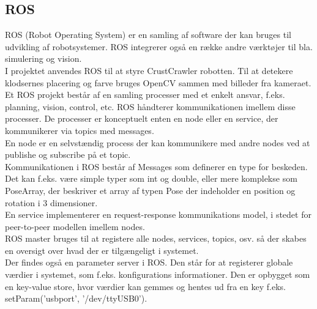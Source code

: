 \subsection{ROS}

ROS (Robot Operating System) er en samling af software der kan bruges til udvikling af robotsystemer.
ROS integrerer også en række andre værktøjer til bla. simulering og vision. \\

I projektet anvendes ROS til at styre CrustCrawler robotten. Til at detekere klodsernes placering og farve bruges OpenCV sammen med billeder fra kameraet. \\

Et ROS projekt består af en samling processer med et enkelt ansvar, f.eks. planning, vision, control, etc.
ROS håndterer kommunikationen imellem disse processer.
De processer er konceptuelt enten en node eller en service, der kommunikerer via topics med messages. \\

En node er en selvstændig process der kan kommunikere med andre nodes ved at publishe og subscribe på et topic. \\
Kommunikationen i ROS består af Messages som definerer en type for beskeden.
Det kan f.eks. være simple typer som int og double, eller mere komplekse som PoseArray, der beskriver et array af typen Pose der indeholder en position og rotation i 3 dimensioner. \\
En service implementerer en request-response kommunikations model, i stedet for peer-to-peer modellen imellem nodes. \\
ROS master bruges til at registere alle nodes, services, topics, osv. så der skabes en oversigt over hvad der er tilgængeligt i systemet. \\
Der findes også en parameter server i ROS.
Den står for at registerer globale værdier i systemet, som f.eks. konfigurations informationer.
Den er opbygget som en key-value store, hvor værdier kan gemmes og hentes ud fra en key f.eks. setParam('usbport', '/dev/ttyUSB0').